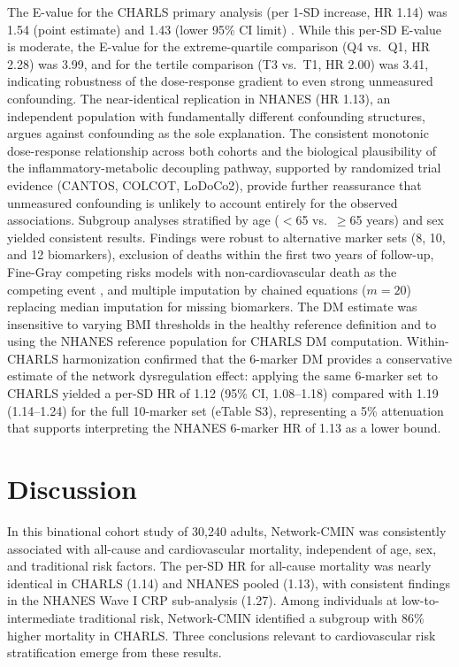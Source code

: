 \documentclass[11pt,a4paper]{article}
\begin{document}
The E-value for the CHARLS primary analysis (per 1-SD increase, HR 1.14) was 1.54 (point estimate) and 1.43 (lower 95\% CI limit) \cite{vanderweele2017evalue}. While this per-SD E-value is moderate, the E-value for the extreme-quartile comparison (Q4 vs.\ Q1, HR 2.28) was 3.99, and for the tertile comparison (T3 vs.\ T1, HR 2.00) was 3.41, indicating robustness of the dose-response gradient to even strong unmeasured confounding. The near-identical replication in NHANES (HR 1.13), an independent population with fundamentally different confounding structures, argues against confounding as the sole explanation. The consistent monotonic dose-response relationship across both cohorts and the biological plausibility of the inflammatory-metabolic decoupling pathway, supported by randomized trial evidence (CANTOS, COLCOT, LoDoCo2), provide further reassurance that unmeasured confounding is unlikely to account entirely for the observed associations. Subgroup analyses stratified by age ($<$65 vs.\ $\geq$65 years) and sex yielded consistent results. Findings were robust to alternative marker sets (8, 10, and 12 biomarkers), exclusion of deaths within the first two years of follow-up, Fine-Gray competing risks models with non-cardiovascular death as the competing event \cite{fine1999competing}, and multiple imputation by chained equations ($m = 20$) replacing median imputation for missing biomarkers. The DM estimate was insensitive to varying BMI thresholds in the healthy reference definition and to using the NHANES reference population for CHARLS DM computation. Within-CHARLS harmonization confirmed that the 6-marker DM provides a conservative estimate of the network dysregulation effect: applying the same 6-marker set to CHARLS yielded a per-SD HR of 1.12 (95\% CI, 1.08--1.18) compared with 1.19 (1.14--1.24) for the full 10-marker set (eTable S3), representing a 5\% attenuation that supports interpreting the NHANES 6-marker HR of 1.13 as a lower bound.

\section{Discussion}

In this binational cohort study of 30,240 adults, Network-CMIN was consistently associated with all-cause and cardiovascular mortality, independent of age, sex, and traditional risk factors. The per-SD HR for all-cause mortality was nearly identical in CHARLS (1.14) and NHANES pooled (1.13), with consistent findings in the NHANES Wave I CRP sub-analysis (1.27). Among individuals at low-to-intermediate traditional risk, Network-CMIN identified a subgroup with 86\% higher mortality in CHARLS. Three conclusions relevant to cardiovascular risk stratification emerge from these results.
\end{document}
